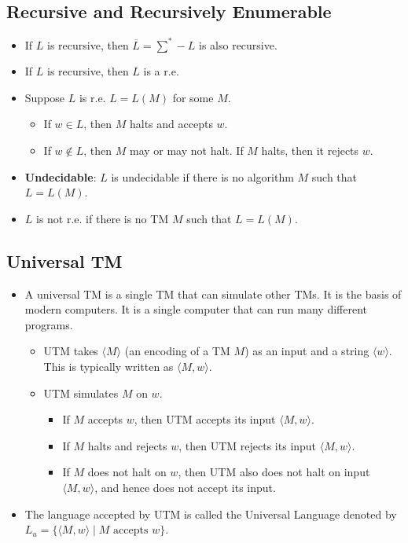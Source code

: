 \documentclass[12pt]{article}
\begin{document}
\subsection{Recursive and Recursively Enumerable}
\begin{itemize}
    \item If $L$ is recursive, then $\overline{L} = \sum^\ast - L$ is also recursive.
    \item If $L$ is recursive, then $L$ is a r.e.
    \item Suppose $L$ is r.e. $L = L(M)$ for some $M$.
    \begin{itemize}
        \item If $w \in L$, then $M$ halts and accepts $w$.
        \item If $w \notin L$, then $M$ may or may not halt. If $M$ halts, then it rejects $w$.
    \end{itemize}
    \item \textbf{Undecidable}: $L$ is undecidable if there is no algorithm $M$ such that $L = L(M)$.
    \item $L$ is not r.e. if there is no TM $M$ such that $L = L(M)$.
\end{itemize}

\subsection{Universal TM}
\begin{itemize}
    \item A universal TM is a single TM that can simulate other TMs. It is the basis of modern computers. It is a single computer that can run many different programs.
    \begin{itemize}
        \item UTM takes $\langle M \rangle$ (an encoding of a TM $M$) as an input and a string $\langle w \rangle$. This is typically written as $\langle M, w \rangle$.
        \item UTM simulates $M$ on $w$.
        \begin{itemize}
            \item If $M$ accepts $w$, then UTM accepts its input $\langle M, w \rangle$.
            \item If $M$ halts and rejects $w$, then UTM rejects its input $\langle M, w \rangle$.
            \item If $M$ does not halt on $w$, then UTM also does not halt on input $\langle M, w \rangle$, and hence does not accept its input.
        \end{itemize}
    \end{itemize}
    \item The language accepted by UTM is called the Universal Language denoted by $L_u = \{ \langle M, w \rangle \mid \text{$M$ accepts $w$} \}$.
\end{itemize}
\end{document}
